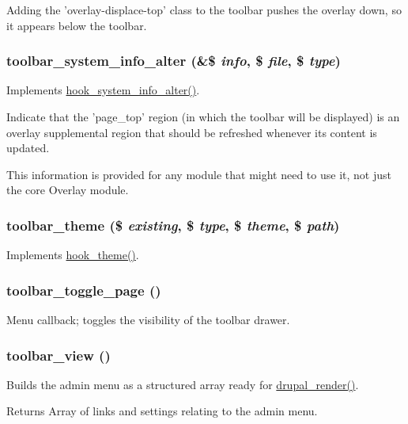 Adding the 'overlay-\/displace-\/top' class to the toolbar pushes the overlay down, so it appears below the toolbar. \hypertarget{toolbar_8module_a6aea9fd1fb8df058eb4df4a7cb77d43e}{
\subsubsection[{toolbar\_\-system\_\-info\_\-alter}]{\setlength{\rightskip}{0pt plus 5cm}toolbar\_\-system\_\-info\_\-alter (\&\$ {\em info}, \/  \$ {\em file}, \/  \$ {\em type})}}
\label{toolbar_8module_a6aea9fd1fb8df058eb4df4a7cb77d43e}
Implements \hyperlink{group__hooks_ga7dd7f887131916d5bbbb02ae87a9113e}{hook\_\-system\_\-info\_\-alter()}.

Indicate that the 'page\_\-top' region (in which the toolbar will be displayed) is an overlay supplemental region that should be refreshed whenever its content is updated.

This information is provided for any module that might need to use it, not just the core Overlay module. \hypertarget{toolbar_8module_aa7b0064fb9c544ae3adb8813dd3019a0}{
\subsubsection[{toolbar\_\-theme}]{\setlength{\rightskip}{0pt plus 5cm}toolbar\_\-theme (\$ {\em existing}, \/  \$ {\em type}, \/  \$ {\em theme}, \/  \$ {\em path})}}
\label{toolbar_8module_aa7b0064fb9c544ae3adb8813dd3019a0}
Implements \hyperlink{group__hooks_ga013ccb45c7aaab1c16cf9691428c910d}{hook\_\-theme()}. \hypertarget{toolbar_8module_a84504c00fcc9385a1ee4aff32d51266d}{
\subsubsection[{toolbar\_\-toggle\_\-page}]{\setlength{\rightskip}{0pt plus 5cm}toolbar\_\-toggle\_\-page ()}}
\label{toolbar_8module_a84504c00fcc9385a1ee4aff32d51266d}
Menu callback; toggles the visibility of the toolbar drawer. \hypertarget{toolbar_8module_a36f95831ad601605940061ff8a51d8f4}{
\subsubsection[{toolbar\_\-view}]{\setlength{\rightskip}{0pt plus 5cm}toolbar\_\-view ()}}
\label{toolbar_8module_a36f95831ad601605940061ff8a51d8f4}
Builds the admin menu as a structured array ready for \hyperlink{common_8inc_a05798b44e8d6c496d4bee5cc32fa7851}{drupal\_\-render()}.

\begin{DoxyReturn}{Returns}
Array of links and settings relating to the admin menu. 
\end{DoxyReturn}
